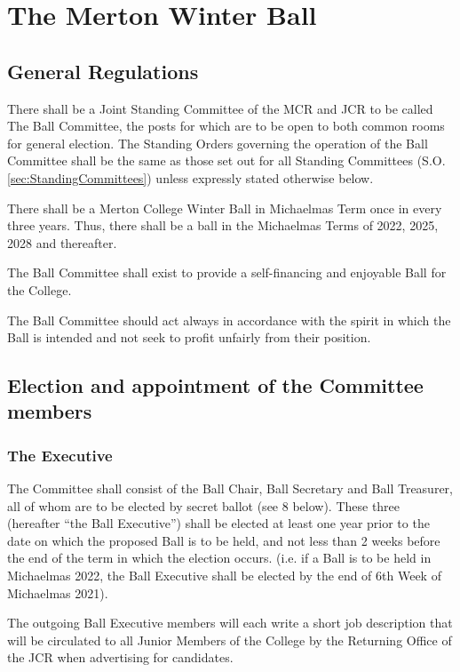 \chapter{The Merton Winter Ball} \label{App:WinterBall}
\section{General Regulations}
\appnpara There shall be a Joint Standing Committee of the MCR and JCR to be called The Ball Committee, the posts for which are to be open to both common rooms for general election.  The Standing Orders governing the operation of the Ball Committee shall be the same as those set out for all Standing Committees (S.O. \ref{sec:StandingCommittees}) unless expressly stated otherwise below.

\appnpara There shall be a Merton College Winter Ball in Michaelmas Term once in every three years.  Thus, there shall be a ball in the Michaelmas Terms of 2022, 2025, 2028 and thereafter.

\appnpara The Ball Committee shall exist to provide a self-financing and enjoyable Ball for the College.  

\appnpara The Ball Committee should act always in accordance with the spirit in which the Ball is intended and not seek to profit unfairly from their position.

\section{Election and appointment of the Committee members}

\subsection{The Executive}
 
\appnpara The Committee shall consist of the Ball Chair, Ball Secretary and Ball Treasurer, all of whom are to be elected by secret ballot (see 8 below). These three (hereafter “the Ball Executive”) shall be elected at least one year prior to the date on which the proposed Ball is to be held, and not less than 2 weeks before the end of the term in which the election occurs.  (i.e. if a Ball is to be held in Michaelmas 2022, the Ball Executive shall be elected by the end of 6th Week of Michaelmas 2021). 

\appnpara The outgoing Ball Executive members will each write a short job description that will be circulated to all Junior Members of the College by the Returning Office of the JCR when advertising for candidates.

